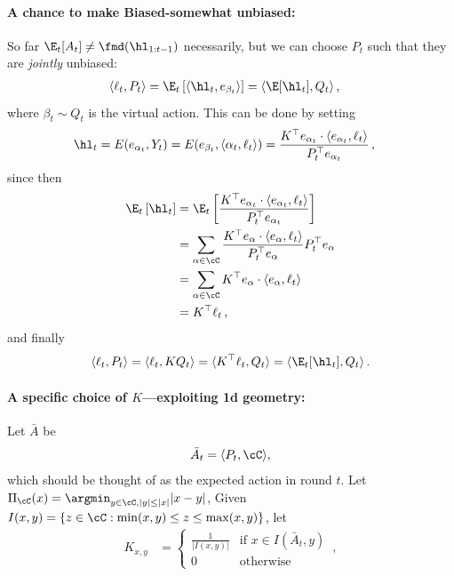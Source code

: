 \paragraph{A chance to make Biased-\smdalg somewhat unbiased:}
So far $\E_t[A_t] \neq \fmd(\hl_{1:t-1})$
necessarily, but we can choose $P_t$
such that they are \textit{jointly} unbiased:
\begin{align*}
    \langle \ell_t, P_t \rangle
     & =
    \E_t\left[\langle \hl_t, e_{\beta_t}\rangle\right]
    =
    \langle \E[\hl_t], Q_t \rangle\,,
\end{align*}
where $\beta_t \sim Q_t$ is the virtual action.
This can be done by setting
\begin{align*}
    \hl_t & = E(e_{\alpha_t}, Y_t)
    = E(e_{\beta_t}, \langle \alpha_t, \ell_t\rangle)
    = \frac{K^\top e_{\alpha_t} \cdot \langle e_{\alpha_t}, \ell_t\rangle}{
        P_t^\top e_{\alpha_t}
    }\,,
\end{align*}
since then
\begin{align*}
    \E_t\left[\hl_t\right]
     & =
    \E_t\left[
        \frac{K^\top e_{\alpha_t} \cdot \langle e_{\alpha_t}, \ell_t\rangle}{
            P_t^\top e_{\alpha_t}}
    \right] \\
     & =
    \sum_{\alpha \in \cC}
    \frac{K^\top e_{\alpha}
        \cdot \langle e_{\alpha}, \ell_t\rangle}{
        P_t^\top e_{\alpha}}
    P_t^\top e_{\alpha}
    \\
     & =
    \sum_{\alpha \in \cC}
    K^\top e_{\alpha}
    \cdot \langle e_{\alpha}, \ell_t\rangle
    \\
     & =
    K^\top \ell_t\,,
\end{align*}
and finally
\begin{align*}
    \langle \ell_t, P_t \rangle
    = \langle \ell_t, K Q_t \rangle
    = \langle K^\top \ell_t, Q_t \rangle
    = \langle \E_t[\hl_t], Q_t \rangle\,.
\end{align*}

\paragraph{A specific choice of \texorpdfstring{$K$}{K}---exploiting 1d geometry:}
Let $\bar{A}$ be
\begin{align*}
    \bar{A}_t = \langle P_t, \cC \rangle,
\end{align*}
which should be thought of as the expected action in round $t$.
Let $\Pi_\cC(x) = \argmin_{y \in \cC, |y| \leq |x|} |x - y|$,
Given $I(x,y) = \{z \in \cC: \min(x,y) \leq z \leq \max(x,y)\}$,
let
\begin{align*}
    K_{x,y} & =
    \begin{cases}
        \frac{1}{|I(x,y)|} & \text{if } x\in I(\bar{A}_t, y) \\
        0                  & \text{otherwise}
    \end{cases}\,,
\end{align*}

